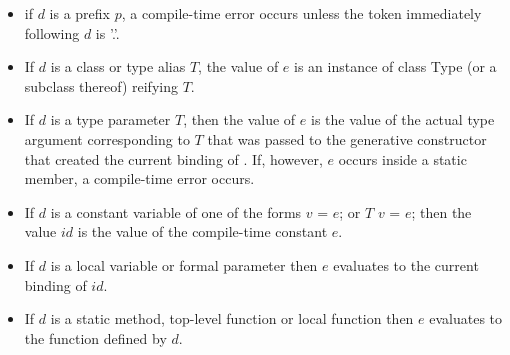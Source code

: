 \documentclass{article}
\newcommand{\code}[1]{{\sf #1}}
\begin{document}
\begin{itemize}
\item if $d$ is a prefix $p$, a compile-time error occurs unless the token immediately following $d$ is \code{'.'}.
\item If $d$ is a class or type alias $T$, the value of $e$ is an instance of  class \code{Type} (or a subclass thereof) reifying $T$.
\item If $d$ is a type parameter $T$, then the value of $e$ is the value of the actual type argument corresponding to $T$ that was  passed to the generative constructor that created the current binding of \THIS{}. If, however, $e$ occurs inside a static member, a compile-time error occurs.

 \item  If $d$ is a constant variable of one of the forms  \code{\CONST{} $v$ = $e$;} or \code{\CONST{} $T$ $v$ = $e$;} then the value $id$ is the value of the compile-time constant $e$.
\item If $d$ is a local variable or formal parameter then $e$ evaluates to the current binding of $id$. 
\item If $d$ is a static method, top-level function or local function then $e$ evaluates to the function defined by $d$.

\end{itemize}
\end{document}
